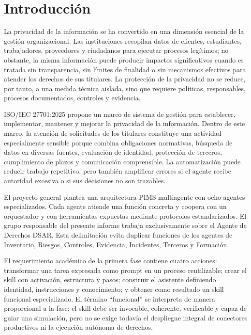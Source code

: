 \documentclass[11pt,a4paper]{article}
\begin{document}
\clearpage
\tableofcontents
\clearpage
{}

\section{Introducción}

La privacidad de la información se ha convertido en una dimensión esencial de la gestión organizacional. Las instituciones recopilan datos de clientes, estudiantes, trabajadores, proveedores y ciudadanos para ejecutar procesos legítimos; no obstante, la misma información puede producir impactos significativos cuando es tratada sin transparencia, sin límites de finalidad o sin mecanismos efectivos para atender los derechos de sus titulares. La protección de la privacidad no se reduce, por tanto, a una medida técnica aislada, sino que requiere políticas, responsables, procesos documentados, controles y evidencia.

ISO/IEC 27701:2025 propone un marco de sistema de gestión para establecer, implementar, mantener y mejorar la privacidad de la información. Dentro de este marco, la atención de solicitudes de los titulares constituye una actividad especialmente sensible porque combina obligaciones normativas, búsqueda de datos en diversas fuentes, evaluación de identidad, protección de terceros, cumplimiento de plazos y comunicación comprensible. La automatización puede reducir trabajo repetitivo, pero también amplificar errores si el agente recibe autoridad excesiva o si sus decisiones no son trazables.

El proyecto general plantea una arquitectura PIMS multiagente con ocho agentes especializados. Cada agente atiende una función concreta y coopera con un orquestador y con herramientas expuestas mediante protocolos estandarizados. El grupo responsable del presente informe trabaja exclusivamente sobre el Agente de Derechos DSAR. Esta delimitación evita duplicar funciones de los agentes de Inventario, Riesgos, Controles, Evidencia, Incidentes, Terceros y Formación.

El requerimiento académico de la primera fase contiene cuatro acciones: transformar una tarea expresada como prompt en un proceso reutilizable; crear el skill con activación, estructura y pasos; construir el asistente definiendo identidad, instrucciones y conocimiento; y obtener como resultado un skill funcional especializado. El término ``funcional'' se interpreta de manera proporcional a la fase: el skill debe ser invocable, coherente, verificable y capaz de guiar una simulación, pero no se exige todavía el despliegue integral de conectores productivos ni la ejecución autónoma de derechos.
\end{document}
